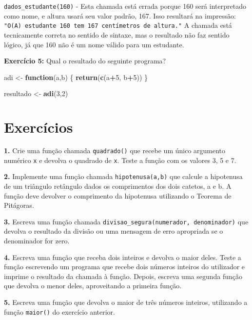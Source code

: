 \documentclass[
]{book}
\newenvironment{Shaded}{\begin{snugshade}}{\end{snugshade}}
\newcommand{\ControlFlowTok}[1]{\textcolor[rgb]{0.13,0.29,0.53}{\textbf{#1}}}
\newcommand{\DecValTok}[1]{\textcolor[rgb]{0.00,0.00,0.81}{#1}}
\newcommand{\FunctionTok}[1]{\textcolor[rgb]{0.13,0.29,0.53}{\textbf{#1}}}
\newcommand{\NormalTok}[1]{#1}
\newcommand{\OtherTok}[1]{\textcolor[rgb]{0.56,0.35,0.01}{#1}}
\newcommand{\SpecialCharTok}[1]{\textcolor[rgb]{0.81,0.36,0.00}{\textbf{#1}}}
\begin{document}
\texttt{dados\_estudante(160)} - Esta chamada está errada porque 160 será
interpretado como nome, e altura usará seu valor padrão, 167. Isso
resultará na impressão:
\texttt{"O(A)\ estudante\ 160\ tem\ 167\ centímetros\ de\ altura."} A chamada está
tecnicamente correta no sentido de sintaxe, mas o resultado não faz
sentido lógico, já que 160 não é um nome válido para um estudante.

\textbf{Exercício 5:} Qual o resultado do seguinte programa?

\begin{Shaded}
\begin{Highlighting}[]
\NormalTok{adi }\OtherTok{\textless{}{-}} \ControlFlowTok{function}\NormalTok{(a,b) \{  }
  \FunctionTok{return}\NormalTok{(}\FunctionTok{c}\NormalTok{(a}\SpecialCharTok{+}\DecValTok{5}\NormalTok{, b}\SpecialCharTok{+}\DecValTok{5}\NormalTok{))}
\NormalTok{\}}

\NormalTok{resultado }\OtherTok{\textless{}{-}} \FunctionTok{adi}\NormalTok{(}\DecValTok{3}\NormalTok{,}\DecValTok{2}\NormalTok{)}
\end{Highlighting}
\end{Shaded}

\section{Exercícios}\label{exercuxedcios-7}

\textbf{1.} Crie uma função chamada \texttt{quadrado()} que recebe um único
argumento numérico \texttt{x} e devolva o quadrado de \texttt{x}. Teste a função com
os valores 3, 5 e 7.

\textbf{2.} Implemente uma função chamada \texttt{hipotenusa(a,b)} que calcule a
hipotenusa de um triângulo retângulo dados os comprimentos dos dois
catetos, a e b. A função deve devolver o comprimento da hipotenusa
utilizando o Teorema de Pitágoras.

\textbf{3.} Escreva uma função chamada
\texttt{divisao\_segura(numerador,\ denominador)} que devolva o resultado da
divisão ou uma mensagem de erro apropriada se o denominador for zero.

\textbf{4.} Escreva uma função que receba dois inteiros e devolva o maior
deles. Teste a função escrevendo um programa que recebe dois números
inteiros do utilizador e imprime o resultado da chamada à função.
Depois, escreva uma segunda função que devolva o menor deles,
aproveitando a primeira função.

\textbf{5.} Escreva uma função que devolva o maior de três números inteiros,
utilizando a função \texttt{maior()} do exercício anterior.
\end{document}
